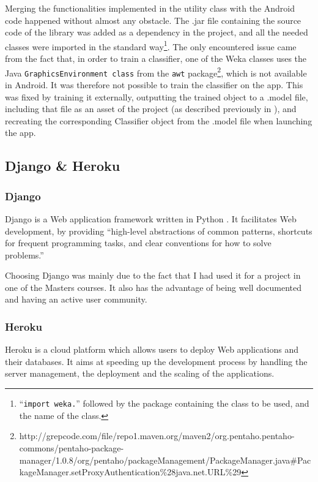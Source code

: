 \documentclass{mproj}
\begin{document}
Merging the functionalities implemented in the utility class with the Android code happened without almost any obstacle. The .jar file containing the source code of the library was added as a dependency in the project, and all the needed classes were imported in the standard way\footnote{``\texttt{import weka.}'' followed by the package containing the class to be used, and the name of the class.}. The only encountered issue came from the fact that, in order to train a classifier, one of the Weka classes uses the Java \verb|GraphicsEnvironment class| from the \verb|awt| package\footnote{http://grepcode.com/file/repo1.maven.org/maven2/org.pentaho.pentaho-commons/pentaho-package-manager/1.0.8/org/pentaho/packageManagement/PackageManager.java\#PackageManager.setProxyAuthentication\%28java.net.URL\%29}, which is not available in Android. It was therefore not possible to train the classifier on the app. This was fixed by training it externally, outputting the trained object to a .model file, including that file as an asset of the project (as described previously in ), and recreating the corresponding Classifier object from the .model file when launching the app.

\subsection{Django \& Heroku}

\subsubsection*{Django}

Django is a Web application framework written in Python \cite{django}. It facilitates Web development, by providing ``high-level abstractions of common patterns, shortcuts for frequent programming tasks, and clear conventions for how to solve problems.'' \cite{djangobook}

Choosing Django was mainly due to the fact that I had used it for a project in one of the Masters courses. It also has the advantage of being well documented and having an active user community.\par

\subsubsection*{Heroku}

Heroku is a cloud platform which allows users to deploy Web applications and their databases. It aims at speeding up the development process by handling the server management, the deployment and the scaling of the applications. \cite{heroku}
\end{document}
